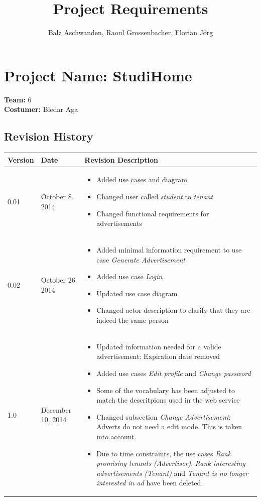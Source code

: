 \documentclass[a4paper,11pt]{article}
\title{Project Requirements}
\author{Balz Aschwanden, Raoul Grossenbacher, Florian Jörg}
\begin{document}
\maketitle
\section*{Project Name: StudiHome}

\textbf{Team:} 6 \\
\textbf{Costumer:} Bledar Aga \\

\subsection*{Revision History}
\begin{tabular}{|p{1.2cm}|p{3cm}|p{8cm}|} \hline
  Version & Date & Revision Description \\ \hline
  0.01 & October 8. 2014 &
  \begin{itemize}
  	\item Added use cases and diagram
  	\item Changed user called \textit{student} to \textit{tenant}
  	\item Changed functional requirements for advertisements
  \end{itemize} \\ \hline
  0.02 & October 26. 2014 & 
  \begin{itemize}
  	\item Added minimal information requirement to use case \textit{Generate Advertisement}
  	\item Added use case \textit{Login}
  	\item Updated use case diagram
  	\item Changed actor description to clarify that they are indeed the same person
  \end{itemize} \\ \hline
  1.0 & December 10. 2014 & 
  \begin{itemize}
    \item Updated information needed for a valide advertisement: Expiration date removed
    \item Added use cases \textit{Edit profile} and \textit{Change password}
    \item Some of the vocabulary has been adjusted to match the descritpions used in the web service
    \item Changed subsection \textit{Change Advertisement}: Adverts do not need a edit mode. This is taken into account.
    \item Due to time constraints, the use cases \textit{Rank promising tenants (Advertiser)}, \textit{Rank interesting advertisements (Tenant)} and \textit{Tenant is no longer interested in ad} have been deleted.
  \end{itemize}\\ \hline

\end{tabular}
\end{document}
